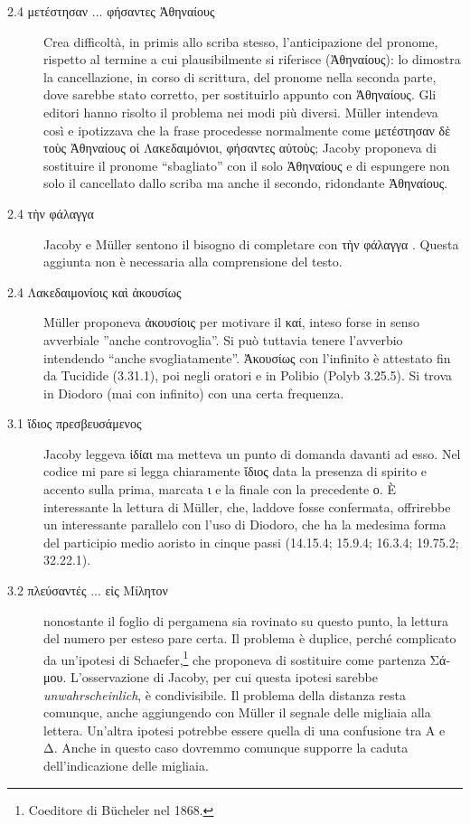 \begin{description}
\item[2.4 \textgreek{μετέστησαν ... φήσαντες Ἀθηναίους}] Crea difficoltà, in primis allo scriba stesso, l'anticipazione del pronome, rispetto al termine a cui plausibilmente si riferisce (\textgreek{Ἀθηναίους}): lo dimostra la cancellazione, in corso di scrittura, del pronome nella seconda parte, dove sarebbe stato corretto, per sostituirlo appunto con \textgreek{Ἀθηναίους}.  Gli editori hanno risolto il problema nei modi più diversi. Müller intendeva così e ipotizzava che la frase procedesse normalmente come \textgreek{μετέστησαν δὲ τοὺς Ἀθηναίους οἱ Λακεδαιμόνιοι, φήσαντες αὐτοὺς}; Jacoby proponeva di sostituire il pronome “sbagliato” con il solo \textgreek{Ἀθηναίους} e di espungere non solo il cancellato dallo scriba ma anche il secondo, ridondante \textgreek{Ἀθηναίους}. 
\item[2.4 \textgreek{τὴν φάλαγγα}] Jacoby e Müller sentono il bisogno di completare con \textgreek{τὴν φάλαγγα }.  Questa aggiunta non è necessaria alla comprensione del testo. 
\item[2.4 \textgreek{Λακεδαιμονίοις καὶ ἀκουσίως}] Müller proponeva \textgreek{ἀκουσίοις} per motivare il \textgreek{καί}, inteso forse in senso avverbiale ''anche controvoglia''. Si può tuttavia tenere l'avverbio intendendo “anche svogliatamente”. \textgreek{Ἀκουσίως} con l'infinito è attestato fin da Tucidide (3.31.1), poi negli oratori e in Polibio (Polyb 3.25.5). Si trova in Diodoro (mai con infinito) con una certa frequenza.
\item[3.1 \textgreek{ἴδιος πρεσβευσάμενος}] Jacoby leggeva \textgreek{ἰδίαι} ma metteva un punto di domanda davanti ad esso. Nel codice mi pare si legga chiaramente \textgreek{ἴδιος} data la presenza di spirito e accento sulla prima, marcata \textgreek{ι} e la finale con la precedente \textgreek{ο}. È interessante la lettura di Müller, che, laddove fosse confermata, offrirebbe un interessante parallelo con l'uso di Diodoro, che ha la medesima forma del participio medio aoristo in cinque passi (14.15.4; 15.9.4; 16.3.4; 19.75.2; 32.22.1).
\item[3.2 \textgreek{πλεύσαντές  ... εἰς Μίλητον}] nonostante il foglio di pergamena sia rovinato su questo punto, la lettura del numero per esteso pare certa. Il problema è duplice, perché complicato da un'ipotesi di Schaefer,\footnote{Coeditore di Bücheler nel 1868.} che proponeva di sostituire come partenza  \textgreek{Σάμου}. L'osservazione di Jacoby, per cui questa ipotesi sarebbe \textit{unwahrscheinlich}, è condivisibile. Il problema della distanza resta comunque, anche aggiungendo con Müller il segnale delle migliaia alla lettera. Un'altra ipotesi potrebbe essere quella di una confusione tra \textgreek{A} e \textgreek{Δ}. Anche in questo caso dovremmo comunque supporre la caduta dell'indicazione delle migliaia. 

\end{description}
